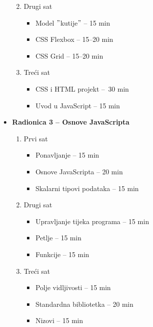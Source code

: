 \begin{itemize}
\begin{enumerate}
\begin{itemize}
                \end{itemize}
            \item Drugi sat
                \begin{itemize}
                    \item Model \("\)kutije\("\) -- 15 min
                    \item CSS Flexbox -- 15--20 min
                    \item CSS Grid -- 15--20 min
                \end{itemize}
            \item Treći sat
                \begin{itemize}
                    \item CSS i HTML projekt --\ 30 min
                    \item Uvod u JavaScript -- 15 min
                \end{itemize}
        \end{enumerate}
    \item \textbf{Radionica 3 -- Osnove JavaScripta}
        \begin{enumerate}
            \item Prvi sat
                \begin{itemize}
                    \item Ponavljanje -- 15 min
                    \item Osnove JavaScripta -- 20 min
                    \item Skalarni tipovi podataka -- 15 min
                \end{itemize}
            \item Drugi sat
                \begin{itemize}
                    \item Upravljanje tijeka programa -- 15 min
                    \item Petlje -- 15 min
                    \item Funkcije -- 15 min
                \end{itemize}
            \item Treći sat
                \begin{itemize}
                    \item Polje vidljivosti -- 15 min
                    \item Standardna bibliotetka -- 20 min
                    \item Nizovi -- 15 min
                \end{itemize}

\end{enumerate}
\end{itemize}
